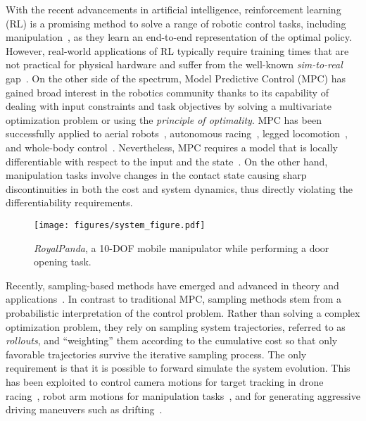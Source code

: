 With the recent advancements in artificial intelligence, reinforcement learning (RL) is a promising method to solve a range of robotic control tasks, including manipulation~\cite{finn2016deep}, as they learn an end-to-end representation of the optimal policy. However, real-world applications of RL typically require training times that are not practical for physical hardware and suffer from the well-known \textit{sim-to-real} gap~\cite{chebotar2019closing}. 
On the other side of the spectrum, Model Predictive Control (MPC) has gained broad interest in the robotics community thanks to its capability of dealing with input constraints and task objectives by solving a multivariate optimization problem or using the \textit{principle of optimality}. 
MPC has been successfully applied to aerial robots~\cite{brunner2020trajectory}, autonomous racing~\cite{liniger2015optimization}, legged locomotion~\cite{grandia2019frequency}, and whole-body control~\cite{minniti2019whole}. 
Nevertheless, MPC requires a model that is locally differentiable with respect to the input and the state~\cite{buchli2017optimal}. On the other hand, manipulation tasks involve changes in the contact state causing sharp discontinuities in both the cost and system dynamics, thus directly violating the differentiability requirements. 


\begin{figure}[t]
\centering
\texttt{[image: figures/system\_figure.pdf]}
\caption{\textit{RoyalPanda}, a 10-DOF mobile manipulator while performing a door opening task.} \label{fig:royal_panda}
\end{figure}

Recently, sampling-based methods have emerged and advanced in theory and applications~\cite{lee_aggressive_2020,abraham_model-based_2020,williams_information_nodate,williams_information_2017,rajamaki_augmenting_2017}. 
In contrast to traditional MPC, sampling methods stem from a probabilistic interpretation of the control problem. 
Rather than solving a complex optimization problem, they rely on sampling system trajectories, referred to as \textit{rollouts}, and ``weighting'' them according to the cumulative cost so that only favorable trajectories survive the iterative sampling process. The only requirement is that it is possible to forward simulate the system evolution. This has been exploited to control camera motions for target tracking in drone racing~\cite{lee_aggressive_2020}, robot arm motions for manipulation tasks~\cite{abraham_model-based_2020}, and for generating aggressive driving maneuvers such as drifting~\cite{williams_information_nodate, williams_information_2017}. 

